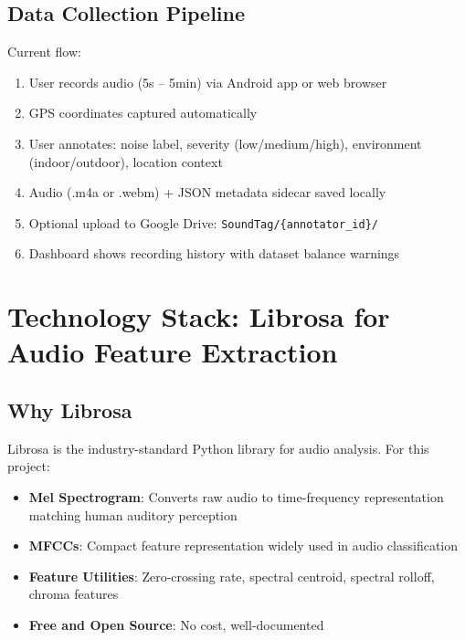 \documentclass[11pt,a4paper]{article}
\begin{document}
\subsection{Data Collection Pipeline}

Current flow:
\begin{enumerate}[leftmargin=*,noitemsep]
    \item User records audio (5s -- 5min) via Android app or web browser
    \item GPS coordinates captured automatically
    \item User annotates: noise label, severity (low/medium/high), environment (indoor/outdoor), location context
    \item Audio (.m4a or .webm) + JSON metadata sidecar saved locally
    \item Optional upload to Google Drive: \texttt{SoundTag/\{annotator\_id\}/}
    \item Dashboard shows recording history with dataset balance warnings
\end{enumerate}

\section{Technology Stack: Librosa for Audio Feature Extraction}

\subsection{Why Librosa}

Librosa is the industry-standard Python library for audio analysis. For this project:

\begin{itemize}[leftmargin=*,noitemsep]
    \item \textbf{Mel Spectrogram}: Converts raw audio to time-frequency representation matching human auditory perception
    \item \textbf{MFCCs}: Compact feature representation widely used in audio classification
    \item \textbf{Feature Utilities}: Zero-crossing rate, spectral centroid, spectral rolloff, chroma features
    \item \textbf{Free and Open Source}: No cost, well-documented
\end{itemize}
\end{document}
